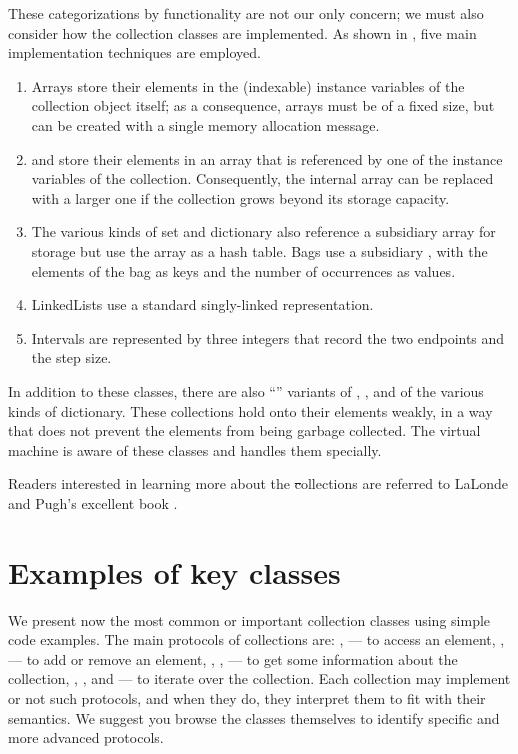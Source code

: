 \documentclass[a4paper,10pt,twoside]{book}
\begin{document}
These categorizations by functionality are not our only concern; we must also consider how the collection classes are implemented.
As shown in , five main implementation techniques are employed.

\begin{enumerate}
  \item Arrays store their elements in the (indexable) instance variables of the collection object itself; as a consequence, arrays must be of a fixed size, but can be created with a single memory allocation message.
  \item {} and  store their elements in an array that is referenced by one of the instance variables of the collection.
  Consequently, the internal array can be replaced with a larger one if the collection grows beyond its storage capacity.
  \item The various kinds of set and dictionary also reference a subsidiary array for storage but use the array as a hash table.
  Bags use a subsidiary , with the elements of the bag as keys and the number of occurrences as values.
  \item LinkedLists use a standard singly-linked representation.
  \item Intervals are represented by three integers that record the two endpoints and the step size.
\end{enumerate}
In addition to these classes, there are also ``'' variants of , , and of the various kinds of dictionary.
These collections hold onto their elements weakly, \ie in a way that does not prevent the elements from being garbage collected.
The \sq virtual machine is aware of these classes and handles them specially.

Readers interested in learning more about the \st collections are referred to LaLonde and Pugh's excellent book \cite{LaLo90a}.

\section{Examples of key classes}
We present now the most common or important collection classes using simple code examples. 
The main protocols of collections are: ,  --- to access an element, ,  --- to add or remove an element, , ,  --- to get some information about the collection, , , and  --- to iterate over the collection. 
Each collection may implement or not such protocols, and when they do, they interpret them to fit with their semantics.
We suggest you browse the classes themselves to identify specific and more advanced protocols.
\end{document}
